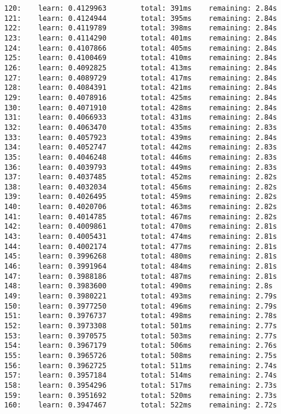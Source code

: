 \documentclass[11pt]{article}
\begin{document}
\begin{Verbatim}[commandchars=\\\{\}]
120:    learn: 0.4129963        total: 391ms    remaining: 2.84s
121:    learn: 0.4124944        total: 395ms    remaining: 2.84s
122:    learn: 0.4119789        total: 398ms    remaining: 2.84s
123:    learn: 0.4114290        total: 401ms    remaining: 2.84s
124:    learn: 0.4107866        total: 405ms    remaining: 2.84s
125:    learn: 0.4100469        total: 410ms    remaining: 2.84s
126:    learn: 0.4092825        total: 413ms    remaining: 2.84s
127:    learn: 0.4089729        total: 417ms    remaining: 2.84s
128:    learn: 0.4084391        total: 421ms    remaining: 2.84s
129:    learn: 0.4078916        total: 425ms    remaining: 2.84s
130:    learn: 0.4071910        total: 428ms    remaining: 2.84s
131:    learn: 0.4066933        total: 431ms    remaining: 2.84s
132:    learn: 0.4063470        total: 435ms    remaining: 2.83s
133:    learn: 0.4057923        total: 439ms    remaining: 2.84s
134:    learn: 0.4052747        total: 442ms    remaining: 2.83s
135:    learn: 0.4046248        total: 446ms    remaining: 2.83s
136:    learn: 0.4039793        total: 449ms    remaining: 2.83s
137:    learn: 0.4037485        total: 452ms    remaining: 2.82s
138:    learn: 0.4032034        total: 456ms    remaining: 2.82s
139:    learn: 0.4026495        total: 459ms    remaining: 2.82s
140:    learn: 0.4020706        total: 463ms    remaining: 2.82s
141:    learn: 0.4014785        total: 467ms    remaining: 2.82s
142:    learn: 0.4009861        total: 470ms    remaining: 2.81s
143:    learn: 0.4005431        total: 474ms    remaining: 2.81s
144:    learn: 0.4002174        total: 477ms    remaining: 2.81s
145:    learn: 0.3996268        total: 480ms    remaining: 2.81s
146:    learn: 0.3991964        total: 484ms    remaining: 2.81s
147:    learn: 0.3988186        total: 487ms    remaining: 2.81s
148:    learn: 0.3983600        total: 490ms    remaining: 2.8s
149:    learn: 0.3980221        total: 493ms    remaining: 2.79s
150:    learn: 0.3977250        total: 496ms    remaining: 2.79s
151:    learn: 0.3976737        total: 498ms    remaining: 2.78s
152:    learn: 0.3973308        total: 501ms    remaining: 2.77s
153:    learn: 0.3970575        total: 503ms    remaining: 2.77s
154:    learn: 0.3967179        total: 506ms    remaining: 2.76s
155:    learn: 0.3965726        total: 508ms    remaining: 2.75s
156:    learn: 0.3962725        total: 511ms    remaining: 2.74s
157:    learn: 0.3957184        total: 514ms    remaining: 2.74s
158:    learn: 0.3954296        total: 517ms    remaining: 2.73s
159:    learn: 0.3951692        total: 520ms    remaining: 2.73s
160:    learn: 0.3947467        total: 522ms    remaining: 2.72s

\end{Verbatim}
\end{document}
